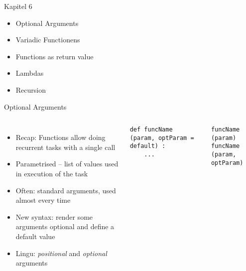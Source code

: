 
\begin{frame}[fragile]{Kapitel 6}
%
\begin{itemize}
\item Optional Arguments
\item Variadic Functionens
\item Functions as return value
\item Lambdas
\item Recursion
\end{itemize}
%
\end{frame}


\begin{frame}[fragile]{Optional Arguments}
%
\begin{columns}[T]
\begin{itemize}
\item Recap: Functions allow doing recurrent tasks with a single call
\item Parametrised -- list of values used in execution of the task
\item Often: standard arguments, used almost every time
\item New syntax: render some arguments optional and define a default value
\item Lingu: \emph{positional} and \emph{optional} arguments
\end{itemize}
%
\begin{codebox}
\begin{verbatim}
def funcName (param, optParam = default) :
    ...
\end{verbatim}
\end{codebox}
%
\begin{codebox}
\begin{verbatim}
funcName (param)
funcName (param, optParam)
\end{verbatim}
\end{codebox}
\end{columns}
%
\end{frame}


